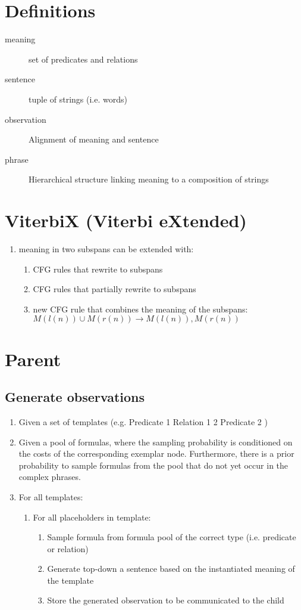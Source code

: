 \documentclass[a4paper]{article}
\begin{document}
\section{Definitions}
\begin{description}
  \item[meaning] set of predicates and relations
  \item[sentence] tuple of strings (i.e. words)
  \item[observation] Alignment of meaning and sentence
  \item[phrase] Hierarchical structure linking meaning to a composition of strings
\end{description}

\section{ViterbiX (Viterbi eXtended)}
\begin{enumerate}
  \item meaning in two subspans can be extended with:
    \begin{enumerate}
      \item CFG rules that rewrite to subspans
      \item CFG rules that partially rewrite to subspans
      \item new CFG rule that combines the meaning of the subspans: $M(l(n)) \cup M(r(n)) \rightarrow M(l(n)), M(r(n))$
    \end{enumerate}
\end{enumerate}

\section{Parent}
\subsection{Generate observations}
\begin{enumerate}
  \item Given a set of templates (e.g. Predicate 1 Relation 1 2 Predicate 2 )
  \item Given a pool of formulas, where the sampling probability is conditioned on the costs of the corresponding exemplar node. Furthermore, there is a prior probability to sample formulas from the pool that do not yet occur in the complex phrases.
  \item For all templates:
    \begin{enumerate}
      \item For all placeholders in template:
        \begin{enumerate}
          \item Sample formula from formula pool of the correct type (i.e. predicate or relation)
          \item Generate top-down a sentence based on the instantiated meaning of the template
          \item Store the generated observation to be communicated to the child
        \end{enumerate}
    \end{enumerate}
\end{enumerate}
\end{document}
